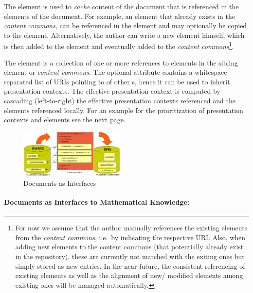 \documentclass[a4paper]{article}
\begin{document}
The {} element is used to {\emph{cache}} content of the document that is
referenced in the {} elements of the document. For example, an
{} element that already exists in the {\emph{content commons}}, can be
referenced in the {} element and may optionally be copied to the
{} element. Alternatively, the author can write a new {}
element himself, which is then added to the {} element and eventually
added to the {\emph{content commons}}\footnote{For now we assume that the author manually
  references the existing elements from the \textit{content commons}, i.e.\ by indicating
  the respective URI. Also, when adding new elements to the content commons (that
  potentially already exist in the repository), these are currently not matched with the
  exiting ones but simply stored as new entries. In the near future, the consistent
  referencing of existing elements as well as the alignment of new/ modified elements
  among existing ones will be managed automatically.}.

The {} element is a collection of one or more references to
{} elements in the sibling {} element or
{\emph{content commons}}. The optional {} attribute contains a
whitespace-separated list of URIs pointing to {} of other {\narcon}s,
hence it can be used to inherit presentation contexts. The effective presentation context
is computed by cascading (left-to-right) the effective presentation contexts referenced
and the {} elements referenced locally. For an example for the
prioritization of presentation contexts and elements see the next page.

\begin{figure}[ht]
\includegraphics[width=0.47\textwidth]{img/interfaces.png}
\caption{Documents as Interfaces}\label{fig:interfaces}
\end{figure}
\vspace{-2.0em}
\paragraph{Documents as Interfaces to Mathematical Knowledge:} 
\end{document}
